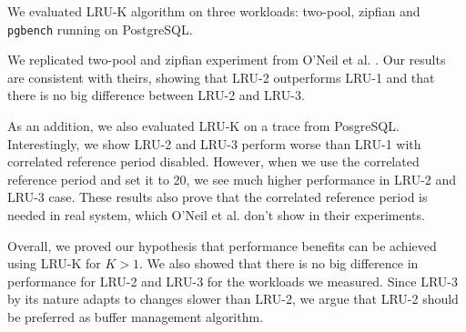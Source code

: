 We evaluated LRU-K algorithm on three workloads: two-pool, zipfian and \texttt{pgbench} running on PostgreSQL. 

We replicated two-pool and zipfian experiment from O'Neil et al. \cite{lruk}. Our results are consistent with theirs, showing that LRU-2 outperforms LRU-1 and that there is no big difference between LRU-2 and LRU-3.

As an addition, we also evaluated LRU-K on a trace from PosgreSQL. Interestingly, we show LRU-2 and LRU-3 perform worse than LRU-1 with correlated reference period disabled. However, when we use the correlated reference period and set it to 20, we see much higher performance in LRU-2 and LRU-3 case. These results also prove that the correlated reference period is needed in real system, which O'Neil et al. \cite{lruk} don't show in their experiments.

Overall, we proved our hypothesis that performance benefits can be achieved using LRU-K for $K > 1$. We also showed that there is no big difference in performance for LRU-2 and LRU-3 for the workloads we measured. Since LRU-3 by its nature adapts to changes slower than LRU-2, we argue that LRU-2 should be preferred as buffer management algorithm.